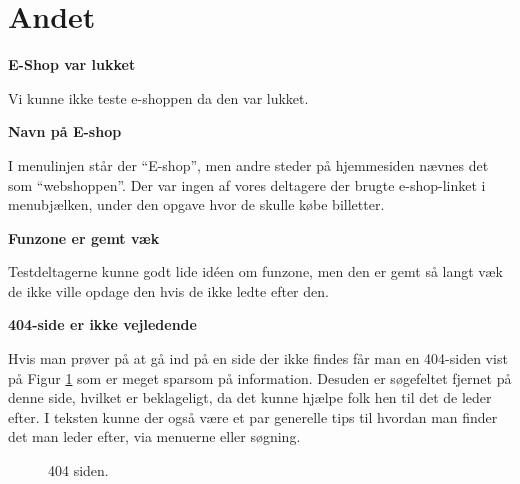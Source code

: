 \documentclass[10pt,a4paper]{article}      %
\newcommand\pic[1]{\texttt{[image: Pics/\#1]}}
\renewcommand\smallproblem{\pic{smallproblem}}
\renewcommand\criticalproblem{\pic{criticalproblem}}
\begin{document}
\section{Andet}
\begin{kommentarer}

\item[\criticalproblem]{\textbf{E-Shop var lukket}}

Vi kunne ikke teste e-shoppen da den var lukket.

\item[\smallproblem]{\textbf{Navn på E-shop}}

I menulinjen står der ``E-shop'', men andre steder på hjemmesiden nævnes det som
``webshoppen''. Der var ingen af vores deltagere der brugte e-shop-linket i
menubjælken, under den opgave hvor de skulle købe billetter.

\item[\smallproblem]{\textbf{Funzone er gemt væk}}

Testdeltagerne kunne godt lide idéen om funzone, men den er gemt så langt væk de
ikke ville opdage den hvis de ikke ledte efter den.

\item[\smallproblem]{\textbf{404-side er ikke vejledende}}

Hvis man prøver på at gå ind på en side der ikke findes får man en 404-siden
vist på Figur \ref{fig:404} som er meget sparsom på information. Desuden er
søgefeltet fjernet på denne side, hvilket er beklageligt, da det kunne hjælpe
folk hen til det de leder efter. I teksten kunne der også være et par generelle
tips til hvordan man finder det man leder efter, via menuerne eller søgning. 

\begin{figure}[htbp]
    \centering
    \caption{404 siden.}
    \label{fig:404}
\end{figure}
\end{kommentarer}


\clearpage
\appendix
{}
\end{document}
